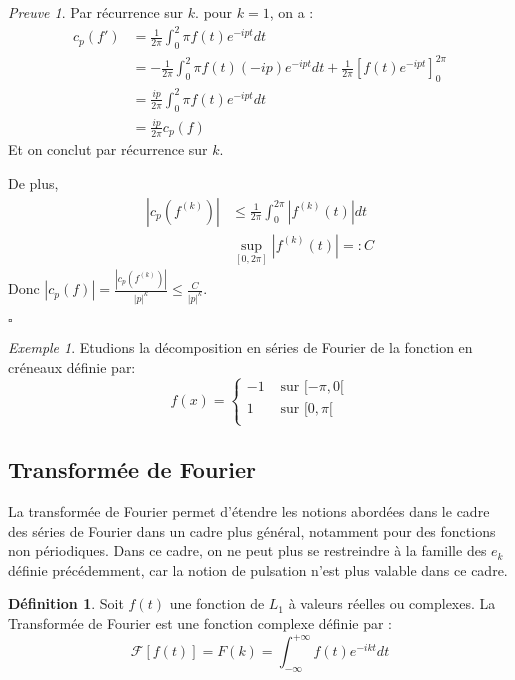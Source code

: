 \documentclass[]{article}
\theoremstyle{remark}
\newtheorem{myproof}{Preuve}
\newtheorem{myexmpl}{Exemple}
\theoremstyle{definition}
\newtheorem{mydef}{Définition}
\newcommand{\cqfd}{
	\hfill$\square$
}
\newcommand{\DS}{\displaystyle}
\begin{document}
	\begin{myproof}
		Par récurrence sur $k$. 
		pour $k=1$, on a :
			\begin{align*}
			c_p(f') &= \frac{1}{2\pi}\int_0^2\pi f(t)e^{-ipt}dt \\
					&= -\frac{1}{2\pi}\int_0^2\pi f(t)(-ip) e^{-ipt}dt + \frac{1}{2\pi}\left[f(t)e^{-ipt} \right]_0^{2\pi} \\
					& = \frac {ip}{2\pi} \int_0^2\pi f(t)e^{-ipt}dt \\
					& = \frac {ip}{2\pi} c_p(f)
			\end{align*}
			Et on conclut par récurrence sur $k$.
		
		De plus, 
		\begin{align*}
		|c_p(f^(k))| &\leqslant \frac{1}{2\pi}\int_0^{2\pi}|f^{(k)}(t)|dt \\
		& \sup_{[0, 2\pi]} |f^{(k)}(t)| =: C 
		\end{align*}
		Donc $ \DS|c_p(f)| = \frac {|c_p(f^{(k)})|}{|p|^k} \leqslant \frac{C}{|p|^k} $.
		\cqfd		
	\end{myproof}
		
			
	\begin{myexmpl}
		Etudions la décomposition en séries de Fourier de la fonction en créneaux définie par: 
		$$ f(x) = \left\{
		\begin{array}{cc}
			-1 & \text{ sur }[-\pi, 0[ \\
			1 & \text{ sur }[0, \pi[ \\
		\end{array}
		\right. $$
	
	\end{myexmpl}
			
			
			
			\subsection{Transformée de Fourier}
				La transformée de Fourier permet d'étendre les notions abordées dans le cadre des séries de Fourier dans un cadre plus général, notamment pour des fonctions non périodiques. 
				Dans ce cadre, on ne peut plus se restreindre à la famille des $e_k$ définie précédemment, car la notion de pulsation n'est plus valable dans ce cadre. 
			
			\begin{mydef}
				Soit $f(t)$ une fonction de $L_1$ à valeurs réelles ou complexes. La Transformée de Fourier est une fonction complexe définie par :
				$$ \mathcal{F}[f(t)] = F(k)= \int_{-\infty}^{+\infty}f(t)e^{-ikt}dt $$ 
			\end{mydef}
		
\end{document}
